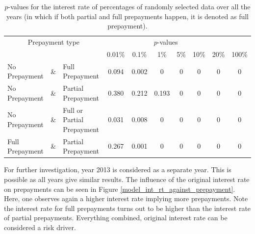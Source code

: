     \begin{table}[H]
        \centering
            \begin{tabular}{lcl|c|c|c|c|c|c|c}
                \multicolumn{3}{c|}{Prepayment type} 
                & \multicolumn{6}{c}{$p$-values}& \\
                &&&0.01\%&0.1\%&1\%&5\%&10\%&20\%&100\%\\\hline
                No Prepayment & \& & Full Prepayment & 0.094 & 0.002&0&0&0&0&0\\
                No Prepayment & \& & Partial Prepayment & 0.380 & 0.212&0.193&0&0&0&0\\
                No Prepayment & \& & Full or Partial Prepayment & 0.031 & 0.008&0&0&0&0&0 \\
                Full Prepayment & \& & Partial Prepayment & 0.267 & 0.001&0&0&0&0&0
		    \end{tabular}
            \caption{
                $p$-values for the interest rate of percentages of randomly selected data over all the years (in which if both partial and full 
                prepayments happen, it is denoted as full prepayment).
                }
	        \label{model_Pvals_of_int}
        \end{table}
    \noindent
    For further investigation, year 2013 is considered 
    as a separate year. This is possible as all years give
    similar results. The influence of the original interest rate on prepayments can be 
    seen in Figure \ref{model_int_rt_against_prepayment}. Here, 
    one observes again a higher interest rate implying more 
    prepayments. Note the interest rate for full prepayments turns out to be higher than the interest rate of partial prepayments. Everything combined, original interest rate can be considered a risk driver.
